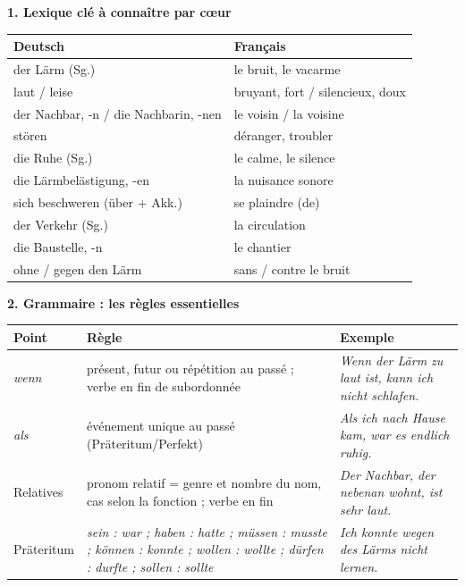 \documentclass[11pt]{article}
\newcommand{\all}[1]{\ifmmode\text{\textit{#1}}\else\begingroup\selectlanguage{ngerman}\itshape #1\endgroup\fi}
\begin{document}
\begin{bilan}

\textbf{1. Lexique clé à connaître par cœur}

\begin{center}
\begin{tabularx}{\linewidth}{|l|X|}
\hline
\rowcolor{popblueL} \textbf{Deutsch} & \textbf{Français} \\
\hline
der Lärm (Sg.) & le bruit, le vacarme \\
\hline
laut / leise & bruyant, fort / silencieux, doux \\
\hline
der Nachbar, -n / die Nachbarin, -nen & le voisin / la voisine \\
\hline
stören & déranger, troubler \\
\hline
die Ruhe (Sg.) & le calme, le silence \\
\hline
die Lärmbelästigung, -en & la nuisance sonore \\
\hline
sich beschweren (über + Akk.) & se plaindre (de) \\
\hline
der Verkehr (Sg.) & la circulation \\
\hline
die Baustelle, -n & le chantier \\
\hline
ohne / gegen den Lärm & sans / contre le bruit \\
\hline
\end{tabularx}
\end{center}

\textbf{2. Grammaire : les règles essentielles}

\begin{center}
\begin{tabularx}{\linewidth}{|l|X|X|}
\hline
\rowcolor{popblueL} \textbf{Point} & \textbf{Règle} & \textbf{Exemple} \\
\hline
\all{wenn} & présent, futur ou répétition au passé ; verbe en fin de subordonnée & \all{Wenn der Lärm zu laut ist, kann ich nicht schlafen.} \\
\hline
\all{als} & événement unique au passé (Präteritum/Perfekt) & \all{Als ich nach Hause kam, war es endlich ruhig.} \\
\hline
Relatives & pronom relatif = genre et nombre du nom, cas selon la fonction ; verbe en fin & \all{Der Nachbar, der nebenan wohnt, ist sehr laut.} \\
\hline
Präteritum & \all{sein : war ; haben : hatte ; müssen : musste ; können : konnte ; wollen : wollte ; dürfen : durfte ; sollen : sollte} & \all{Ich konnte wegen des Lärms nicht lernen.} \\
\hline
\end{tabularx}
\end{center}


\end{bilan}
\end{document}
